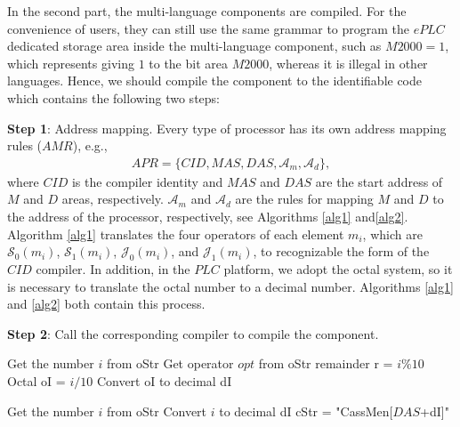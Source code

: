 \documentclass[journal,UTF8]{IEEEtran}
\begin{document}
	In the second part, the multi-language components are compiled. For the convenience of users, they can still use the same grammar to program the $ePLC$ dedicated storage area inside the multi-language component, such as $M2000=1$, which represents giving $1$ to the bit area $M2000$, whereas it is illegal in other languages. Hence, we should compile the component to the identifiable code which contains the following two steps:
	
	\textbf{Step 1}: Address mapping. Every type of processor has its own address mapping rules ($AMR$), e.g.,
	\begin{eqnarray}
	APR = \{CID, MAS, DAS, \mathcal{A}_m, \mathcal{A}_d\},
	\end{eqnarray}
	where $CID$ is the compiler identity and $MAS$ and $DAS$ are the start address of $M$ and $D$ areas, respectively. $\mathcal{A}_m$ and $\mathcal{A}_d$ are the rules for mapping $M$ and $D$ to the address of the processor, respectively, see Algorithms \ref{alg1} and\ref{alg2}. Algorithm \ref{alg1} translates the four operators of each element $m_i$, which are $\mathcal{S}_0(m_i)$, $\mathcal{S}_1(m_i)$, $\mathcal{J}_0(m_i)$, and $\mathcal{J}_1(m_i)$, to recognizable the form of the $CID$ compiler. In addition, in the $PLC$ platform, we adopt the octal system, so it is necessary to translate the octal number to a decimal number. Algorithms \ref{alg1} and \ref{alg2} both contain this process.
	
	
	\textbf{Step 2}: Call the corresponding compiler to compile the component.
	
	
	\begin{algorithm}
		\label{alg1}
		\caption{$\mathcal{A}_m$}%
		Get the number $i$ from oStr\; 
		Get operator $opt$ from oStr\;
		remainder r = $i\%10$\;
		Octal oI =  $i/10$\;
		Convert oI to decimal dI\; 
	\end{algorithm}
	\begin{algorithm}
		\label{alg2}
		\caption{$\mathcal{A}_d$}%
		\KwOut{converted string cStr}%
		Get the number $i$ from oStr\; 
		Convert $i$ to decimal dI\; 
		cStr = "CassMen[$DAS$+dI]"\;
	\end{algorithm}
	
\end{document}
